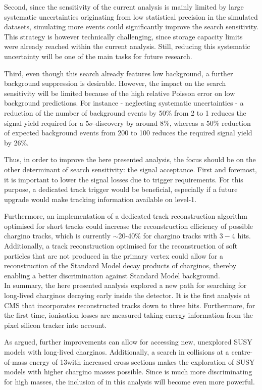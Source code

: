 Second, since the sensitivity of the current analysis is mainly limited by large systematic uncertainties originating from low statistical precision in the simulated datasets, simulating more events could significantly improve the search sensitivity.
This strategy is however technically challenging, since storage capacity limits were already reached within the current analysis.
Still, reducing this systematic uncertainty will be one of the main tasks for future research.

Third, even though this search already features low background, a further background suppression is desirable.
However, the impact on the search sensitivity will be limited because of the high relative Poisson error on low background predictions.
For instance - neglecting systematic uncertainties - a reduction of the number of background events by 50\% from 2 to 1 reduces the signal yield required for a 5$\sigma$-discovery by around 8\%, whereas a 50\% reduction of expected background events from 200 to 100 reduces the required signal yield by 26\%.

Thus, in order to improve the here presented analysis, the focus should be on the other determinant of search sensitivity: the signal acceptance.
First and foremost, it is important to lower the signal losses due to trigger requirements.
For this purpose, a dedicated track trigger would be beneficial, especially if a future upgrade would make tracking information available on level-1.

Furthermore, an implementation of a dedicated track reconstruction algorithm optimised for short tracks could increase the reconstruction efficiency of possible chargino tracks, which is currently $\sim$20-40\% for chargino tracks with $3-4$ hits.
Additionally, a track reconstruction optimised for the reconstruction of soft particles that are not produced in the primary vertex could allow for a reconstruction of the Standard Model decay products of charginos, thereby enabling a better discrimination against Standard Model background.\\

In summary, the here presented analysis explored a new path for searching for long-lived charginos decaying early inside the detector.
It is the first analysis at CMS that incorporates reconstructed tracks down to three hits.
Furthermore, for the first time, ionisation losses are measured taking energy information from the pixel silicon tracker into account.

As argued, further improvements can allow for accessing new, unexplored SUSY models with long-lived charginos.
Additionally, a search in collisions at a centre-of-mass energy of 13\tev with increased cross sections makes the exploration of SUSY models with higher chargino masses possible.
Since \dedx is much more discriminating for high masses, the inclusion of \dedx in this analysis will become even more powerful. 

